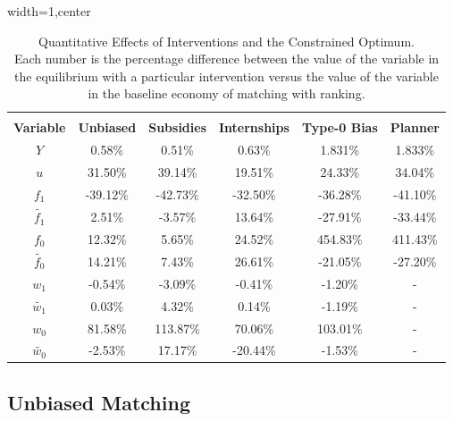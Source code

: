 \documentclass[12pt]{article} %
\theoremstyle{definition}
\begin{document}
\begin{table}[h!]

\begin{adjustbox}{width=1\columnwidth,center}

 \begin{tabular}{||c c c c c c||} 
 \hline
 \\[-1.1em]
 \textbf{Variable} & \textbf{Unbiased} & \textbf{Subsidies} & \textbf{Internships} & \textbf{Type-0 Bias} & \textbf{Planner} \\  
 \hline\hline
  $Y$  & 0.58\% & 0.51\% & 0.63\% & 1.831\% & 1.833\%   \\ 
  $u$  & 31.50\% & 39.14\% & 19.51\% & 24.33\% & 34.04\%   \\ 
  $f_{1}$  & -39.12\% & -42.73\% & -32.50\% & -36.28\% & -41.10\%   \\ 
  $\tilde{f_{1}}$  & 2.51\% & -3.57\% & 13.64\% & -27.91\% & -33.44\% \\
  $f_{0}$  &  12.32\% & 5.65\% & 24.52\% & 454.83\% & 411.43\% \\
  $\tilde{f_{0}}$  & 14.21\% & 7.43\% & 26.61\% & -21.05\% & -27.20\%  \\
  $w_{1}$  & -0.54\% & -3.09\% & -0.41\% & -1.20\% & -  \\
  $\tilde{w_{1}}$ & 0.03\% & 4.32\% & 0.14\% & -1.19\% & - \\
  $w_{0}$  & 81.58\% & 113.87\% & 70.06\% & 103.01\% & - \\
  $\tilde{w_{0}}$ & -2.53\% & 17.17\% & -20.44\% & -1.53\% & - \\ [1ex] 
 \hline
 \end{tabular}
\end{adjustbox}
\centering
     \captionsetup{justification=centering}
\caption{Quantitative Effects of Interventions and the Constrained Optimum. \\ Each number is the percentage difference between the value of the variable in the equilibrium with a particular intervention versus the value of the variable in the baseline economy of matching with ranking.} \label{table_quantitative_results}
\end{table} 

\subsection{Unbiased Matching} \label{section unbiased matching quant}
\end{document}
